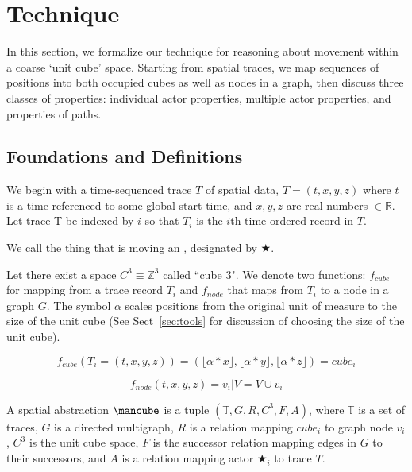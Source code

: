 \section{Technique}
\label{sec:technique}

In this section, we formalize our technique for reasoning about movement within a coarse `unit cube' space.
Starting from spatial traces, we map sequences of positions into both occupied cubes as well as nodes in a graph, then discuss three classes of properties: individual actor properties, multiple actor properties, and properties of paths.

\subsection{Foundations and Definitions}
We begin with a time-sequenced trace $T$ of spatial data, $T = (t,x,y,z)$ where $t$ is a time referenced to some global start time, and $x,y,z$ are real numbers $\in \mathbb{R}$. 
Let trace T be indexed by $i$ so that $T_i$ is the $i$th time-ordered record in $T$.

We call the thing that is moving an , designated by $\bigstar$.

Let there exist a space $C^3 \equiv \mathbb{Z}^3$ called ``cube 3".
We denote two functions: $f_{cube}$ for mapping from a trace record $T_i$ and $f_{node}$ that maps from $T_i$ to a node in a graph $G$. The symbol $\alpha$ scales positions from the original unit of measure to the size of the unit cube (See Sect~\ref{sec:tools} for discussion of choosing the size of the unit cube).

$$f_{cube}(T_i = (t,x,y,z)) = (\lfloor \alpha * x \rfloor, \lfloor \alpha * y \rfloor , \lfloor \alpha * z \rfloor ) = cube_i$$

$$f_{node}(t,x,y,z) = v_i | V = V \cup v_i$$


A spatial abstraction $\cube$ is a tuple $(\mathbb{T}, G, R, C^3, F, A)$, where $\mathbb{T}$ is a set of traces, $G$ is a directed multigraph, $R$ is a relation mapping $cube_i$ to graph node $v_i$, $C^3$ is the unit cube space, $F$ is the successor relation mapping edges in $G$ to their successors, and $A$ is a relation mapping actor $\bigstar_i$ to trace $T$.




